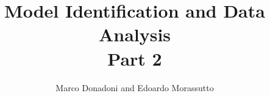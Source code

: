 \documentclass{easyclass}
\begin{document}
\begin{titlepage}
    \title{Model Identification and Data Analysis \\ Part 2}
    \author{Marco Donadoni and Edoardo Morassutto}
    \maketitle
\end{titlepage}

\tableofcontents


















\end{document}
